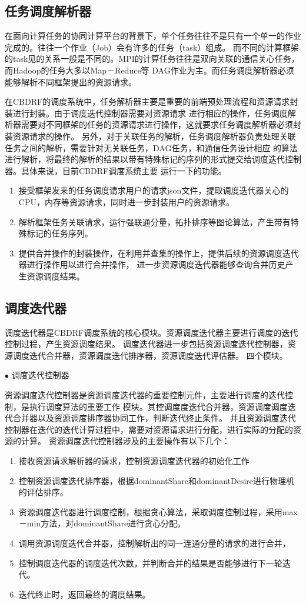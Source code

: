 \subsection{任务调度解析器}
在面向计算任务的协同计算平台的背景下，单个任务往往不是只有一个单一的作业完成的。往往一个作业（Job）会有许多的任务（task）组成。
而不同的计算框架的task见的关系一般是不同的。MPI的计算任务往往是双向关联的通信关心任务，而Hadoop的任务大多以Map－Reduce等
DAG作业为主。而任务调度解析器必须能够解析不同框架提出的资源请求。

在CBDRF的调度系统中，任务解析器主要是重要的前端预处理流程和资源请求封装进行封装。由于调度迭代控制器需要对资源请求
进行相应的操作，任务调度解析器需要对不同框架的任务的资源请求进行操作，这就要求任务调度解析器必须封装资源请求的操作。
另外，对于关联任务的解析，任务调度解析器负责处理关联任务之间的解析，需要针对无关联任务，DAG任务，和通信任务设计相应
的算法进行解析，将最终的解析的结果以带有特殊标记的序列的形式提交给调度迭代控制器。具体来说，目前CBDRF调度系统主要
运行一下的功能。
\begin{enumerate}
\item 接受框架发来的任务调度请求用户的请求json文件，提取调度迭代器关心的CPU，内存等资源请求，同时进一步封装用户的资源请求。
\item 解析框架任务关联请求，运行强联通分量，拓扑排序等图论算法，产生带有特殊标记的任务序列。
\item 提供合并操作的封装操作，在利用并查集的操作上，提供后续的资源调度迭代器进行操作用以进行合并操作，
进一步资源调度迭代器能够查询合并历史产生资源调度结果。
\end{enumerate}

\subsection{调度迭代器}
调度迭代器是CBDRF调度系统的核心模块。资源调度迭代器主要进行调度的迭代控制过程，产生资源调度结果。
调度迭代器进一步包括资源调度迭代控制器，资源调度迭代合并器，资源调度迭代排序器，资源调度迭代评估器。
四个模块。

$\bullet$ 调度迭代控制器

资源调度迭代控制器是资源调度迭代器的重要控制元件，主要进行调度的迭代控制，是执行调度算法的重要工作
模块。其控调度度迭代合并器，资源调度调度迭代合并器以及资源调度排序器协同工作，判断迭代终止条件。
并且资源调度迭代控制器在迭代的迭代计算过程中，需要对资源请求进行分配，进行实际的分配的资源的计算。
资源调度迭代控制器涉及的主要操作有以下几个：
\begin{enumerate}
\item 接收资源请求解析器的请求，控制资源调度迭代器的初始化工作
\item 控制资源调度迭代排序器，根据dominantShare和dominantDesire进行物理机的评估排序。
\item 资源调度迭代器进行调度控制，根据贪心算法，采取调度控制过程，采用max－min方法，对dominantShare进行贪心分配。
\item 调用资源调度迭代合并器，控制解析出的同一连通分量的请求的进行合并，
\item 控制调度迭代器的调度迭代次数，并判断合并的结果是否能够进行下一轮迭代。
\item 迭代终止时，返回最终的调度结果。
\end{enumerate}

